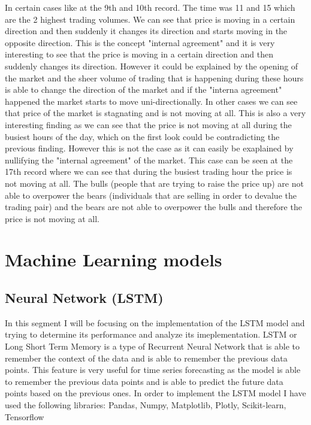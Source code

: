 \documentclass{imc-inf}
\begin{document}
			In certain cases like at the 9th and 10th record. The time was 11 and 15 which are the 2 highest trading volumes. We can see that price is moving in a certain direction and then suddenly it changes its direction and starts moving in the opposite direction.
			This is the concept "internal agreement" and it is very interesting to see that the price is moving in a certain direction and then suddenly changes its direction. However it could be 
			explained by the opening of the market and the sheer volume of trading that is happening during these hours is able to change the direction of the market and if the "interna agreement" happened
			the market starts to move uni-directionally.
			In other cases we can
			see that price of the market is stagnating and is not moving at all. This is also a very interesting finding as we can see that the price is not moving at all during the busiest hours of the day, which 
			on the first look could be contradicting the previous finding. However this is not the case as it can easily be exaplained by nullifying the "internal agreement" of the market.
			This case can be seen at the 17th record where we can see that during the busiest trading hour the price is not moving at all.
			The bulls (people that are trying to raise the price up) are not able to overpower the bears (individuals that are selling in order to devalue the trading pair) and the bears are not able to overpower the bulls and therefore the price is not moving at all. 
			

	\section{Machine Learning models}
		\subsection{Neural Network (LSTM)} 
			In this segment I will be focusing on the implementation of the LSTM \cite{lstm_implement} model and trying to determine its performance and analyze its imeplementation.
			LSTM or Long Short Term Memory is a type of Recurrent Neural Network that is able to remember the context of the data and is able to remember the previous data points.
			This feature is very useful for time series forecasting as the model is able to remember the previous data points and is able to predict the future data points based on the previous ones.
			In order to implement the LSTM model I have used the following libraries: Pandas, Numpy, Matplotlib, Plotly, Scikit-learn, Tensorflow
\end{document}
